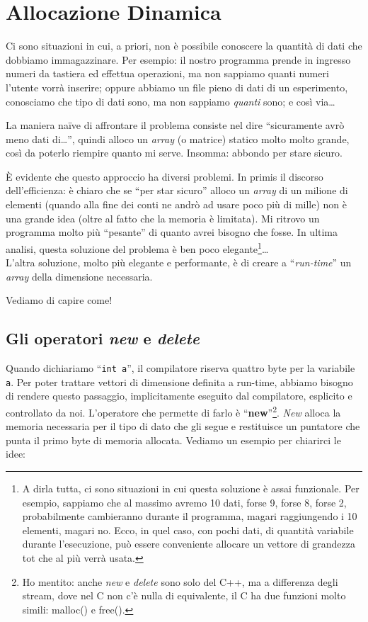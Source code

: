 \chapter{Allocazione Dinamica} \label{ardin}
 Ci sono situazioni in cui, a priori, non è possibile conoscere la quantità di dati che dobbiamo immagazzinare. Per esempio: il nostro programma prende in ingresso numeri da tastiera ed effettua operazioni, ma non sappiamo quanti numeri l'utente vorrà inserire; oppure abbiamo un file pieno di dati di un esperimento, conosciamo che tipo di dati sono, ma non sappiamo \emph{quanti} sono; e così via\ldots
 
 La maniera na{\"i}ve di affrontare il problema consiste nel dire ``sicuramente avrò meno dati di\ldots'', quindi alloco un \emph{array} (o matrice) statico molto molto grande, così da poterlo riempire quanto mi serve. Insomma: abbondo per stare sicuro. 
 
 È evidente che questo approccio ha diversi problemi. In primis il discorso dell'efficienza: è chiaro che se ``per star sicuro'' alloco un \emph{array} di un milione di elementi (quando alla fine dei conti ne andrò ad usare poco più di mille) non è una grande idea (oltre al fatto che la memoria è limitata). Mi ritrovo un programma molto più ``pesante'' di quanto avrei bisogno che fosse. In ultima analisi, questa soluzione del problema è ben poco elegante\footnote{A dirla tutta, ci sono situazioni in cui questa soluzione è assai funzionale. Per esempio, sappiamo che al massimo avremo 10 dati, forse 9, forse 8, forse 2, probabilmente cambieranno durante il programma, magari raggiungendo i 10 elementi, magari no. Ecco, in quel caso, con pochi dati, di quantità variabile durante l'esecuzione, può essere conveniente allocare un vettore di grandezza tot che al più verrà usata.}\ldots \\
 
 L'altra soluzione, molto più elegante e performante, è di creare a ``\emph{run-time}'' un \emph{array} della dimensione necessaria. 
 
 Vediamo di capire come!
\section{Gli operatori \emph{new} e \emph{delete}}
Quando dichiariamo ``\lstinline|int a|'', il compilatore riserva quattro byte per la variabile \verb|a|. Per poter trattare vettori di dimensione definita a run-time, abbiamo bisogno di rendere questo passaggio, implicitamente eseguito dal compilatore, esplicito e controllato da noi. L'operatore che permette di farlo è ``\textbf{new}''\footnote{Ho mentito: anche \emph{new} e \emph{delete} sono solo del C++, ma a differenza degli stream, dove nel C non c'è nulla di equivalente, il C ha due funzioni molto simili: malloc() e free().}. \emph{New} alloca la memoria necessaria per il tipo di dato che gli segue e restituisce un puntatore  che punta il primo byte di memoria allocata. Vediamo un esempio per chiarirci le idee:

